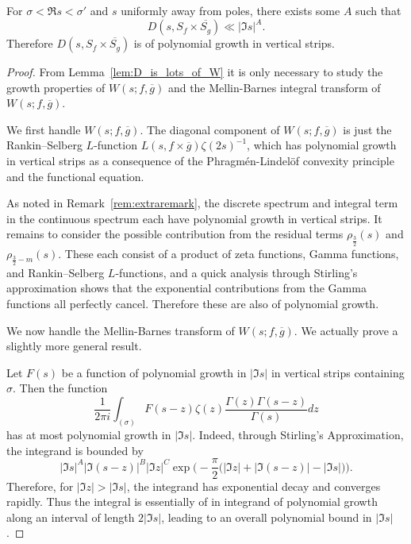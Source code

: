 \begin{lemma}\label{lem:DsSfSg_poly_growth}
  For $\sigma < \Re s < \sigma'$ and $s$ uniformly away from poles, there exists some $A$
  such that
  \begin{equation}
    D(s, S_f \times \overline{S_g}) \ll \lvert \Im s \rvert^A.
  \end{equation}
  Therefore $D(s, S_f \times \overline{S_g})$ is of polynomial growth in vertical strips.
\end{lemma}


\begin{proof}
  From Lemma~\ref{lem:D_is_lots_of_W} it is only necessary to study the growth properties
  of $W(s; f, \overline{g})$ and the Mellin-Barnes integral transform of $W(s; f,
  \overline{g})$.


  We first handle $W(s; f, \overline{g})$.
  The diagonal component of $W(s; f, \overline{g})$ is just the Rankin--Selberg %
  $L$-function $L(s, f\times \overline{g}) \zeta(2s)^{-1}$, which has polynomial growth in
  vertical strips as a consequence of the Phragm\'{e}n-Lindel\"{o}f convexity principle
  and the functional equation.


  As noted in Remark~\ref{rem:extraremark}, the discrete spectrum and integral term in the
  continuous spectrum each have polynomial growth in vertical strips.
  It remains to consider the possible contribution from the residual terms
  $\rho_{\frac{3}{2}}(s)$ and $\rho_{\frac{3}{2} - m}(s)$.
  These each consist of a product of zeta functions, Gamma functions,
  and Rankin--Selberg %
  $L$-functions, and a quick analysis through Stirling's approximation shows that the
  exponential contributions from the Gamma functions all perfectly cancel.
  Therefore these are also of polynomial growth.


  We now handle the Mellin-Barnes transform of $W(s; f, \overline{g})$.
  We actually prove a slightly more general result.


  Let $F(s)$ be a function of polynomial growth in $\lvert \Im s \rvert$ in vertical
  strips containing $\sigma$.
  Then the function
  \begin{equation}
    \frac{1}{2\pi i} \int_{(\sigma)}F(s-z)\zeta(z) \frac{\Gamma(z) \Gamma(s -
    z)}{\Gamma(s)} dz
  \end{equation}
  has at most polynomial growth in $\lvert \Im s \rvert$.
  Indeed, through Stirling's Approximation, the integrand is bounded by
  \begin{equation}
    \lvert \Im s \rvert^A \lvert \Im (s-z) \rvert^B \lvert \Im z \rvert^C
    \exp\bigg(-\frac{\pi}{2}\Big(\lvert \Im z \rvert + \lvert \Im(s-z) \rvert - \lvert \Im
    s \rvert \Big)\bigg).
  \end{equation}
  Therefore, for $\lvert \Im z \rvert > \lvert \Im s \rvert$, the integrand has
  exponential decay and converges rapidly.
  Thus the integral is essentially of in integrand of polynomial growth along an interval
  of length $2 \lvert \Im s \rvert$, leading to an overall polynomial bound in $\lvert \Im
  s \rvert$.
\end{proof}


